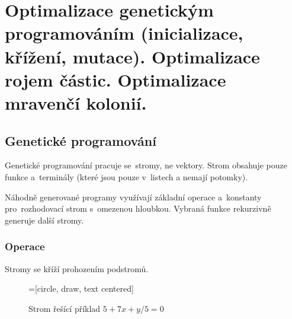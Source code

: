 \clearpage
\section{Optimalizace genetickým programováním (inicializace, křížení, mutace). Optimalizace rojem částic. Optimalizace mravenčí kolonií.}

\subsection{Genetické programování}

Genetické programování pracuje se~stromy, ne vektory.
Strom obsahuje pouze funkce a~terminály (které jsou pouze v~listech a nemají potomky).

Náhodně generované programy využívají základní operace a~konstanty pro~rozhodovací strom s~omezenou hloubkou.
Vybraná funkce rekurzivně generuje další stromy.

\subsubsection{Operace}

Stromy se kříží prohozením podstromů.

\begin{figure}[ht]
    \centering
    =[circle, draw, text centered]
    \caption{Strom řešící příklad $5 + 7x + y/5 = 0$}
\end{figure}
\FloatBarrier

